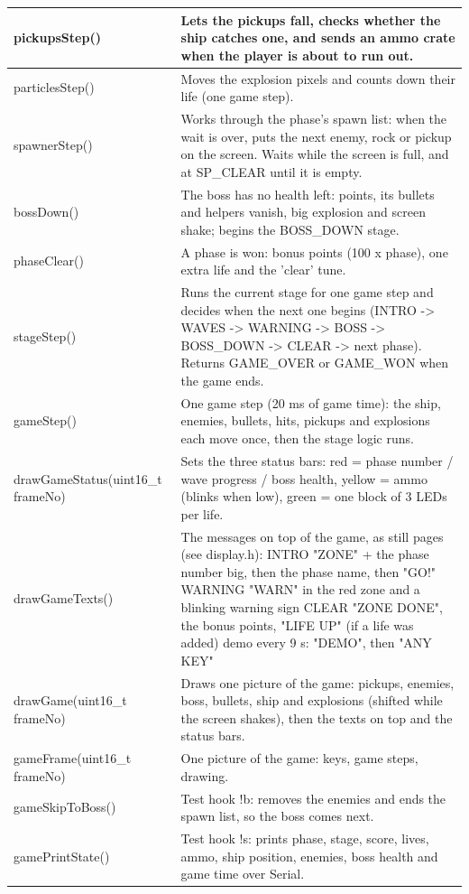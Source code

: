 \documentclass[11pt,a4paper]{article}
\begin{document}
{\begin{longtable}{|>{\raggedright\arraybackslash}p{5.82cm}|>{\raggedright\arraybackslash}p{10.68cm}|}
\rowcolor{rowshade}pickupsStep() & Lets the pickups fall, checks whether the ship catches one, and sends an ammo crate when the player is about to run out.\\\hline
particlesStep() & Moves the explosion pixels and counts down their life (one game step).\\\hline
\rowcolor{rowshade}spawnerStep() & Works through the phase's spawn list: when the wait is over, puts the next enemy, rock or pickup on the screen. Waits while the screen is full, and at SP\_CLEAR until it is empty.\\\hline
bossDown() & The boss has no health left: points, its bullets and helpers vanish, big explosion and screen shake; begins the BOSS\_DOWN stage.\\\hline
\rowcolor{rowshade}phaseClear() & A phase is won: bonus points (100 x phase), one extra life and the 'clear' tune.\\\hline
stageStep() & Runs the current stage for one game step and decides when the next one begins (INTRO -> WAVES -> WARNING -> BOSS -> BOSS\_DOWN -> CLEAR -> next phase). Returns GAME\_OVER or GAME\_WON when the game ends.\\\hline
\rowcolor{rowshade}gameStep() & One game step (20 ms of game time): the ship, enemies, bullets, hits, pickups and explosions each move once, then the stage logic runs.\\\hline
drawGameStatus(uint16\_t frameNo) & Sets the three status bars: red = phase number / wave progress / boss health, yellow = ammo (blinks when low), green = one block of 3 LEDs per life.\\\hline
\rowcolor{rowshade}drawGameTexts() & The messages on top of the game, as still pages (see display.h): INTRO    "ZONE" + the phase number big, then the phase name, then "GO!" WARNING  "WARN" in the red zone and a blinking warning sign CLEAR    "ZONE DONE", the bonus points, "LIFE UP" (if a life was added) demo     every 9 s: "DEMO", then "ANY KEY"\\\hline
drawGame(uint16\_t frameNo) & Draws one picture of the game: pickups, enemies, boss, bullets, ship and explosions (shifted while the screen shakes), then the texts on top and the status bars.\\\hline
\rowcolor{rowshade}gameFrame(uint16\_t frameNo) & One picture of the game: keys, game steps, drawing.\\\hline
gameSkipToBoss() & Test hook !b: removes the enemies and ends the spawn list, so the boss comes next.\\\hline
\rowcolor{rowshade}gamePrintState() & Test hook !s: prints phase, stage, score, lives, ammo, ship position, enemies, boss health and game time over Serial.\\\hline
\end{longtable}}
\end{document}
